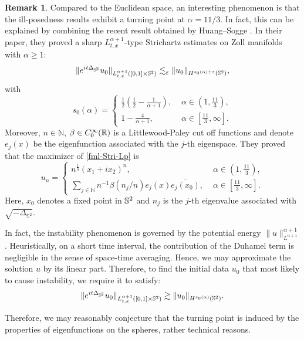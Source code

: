 \documentclass[11pt, reqno]{amsart}
\numberwithin{equation}{section}
\newcommand{\R}{\Bbb R}
\theoremstyle{definition}
\newtheorem{remark}[theorem]{Remark}
\theoremstyle{remark}
\begin{document}
\begin{remark}
Compared to the Euclidean space, an interesting phenomenon is that the ill-posedness results exhibit a turning point at $\alpha=11/3$. In fact, this can be explained by combining the recent result obtained by Huang–Sogge \cite{Huang}. In their paper, they proved a sharp $L^{\alpha+1}_{t,x}$-type Strichartz estimates on Zoll manifolds with $\alpha \ge 1$:
\begin{equation}\label{fml-Stri-Lp}
\|e^{it\Delta_{\Bbb S^2}}u_0\|_{L^{\alpha+1}_{t,x}([0,1]\times \Bbb S^2)} \lesssim_\varepsilon
\|u_0\|_{H^{s_0(\alpha)+\varepsilon}(\Bbb S^2)},
\end{equation}
with
\begin{equation*}
s_0(\alpha)=\begin{cases}
\frac{1}{2}(\frac{1}{2}-\frac{1}{\alpha+1}),\,\, &\alpha\in(1,\frac{11}{3}),\\
1-\frac{4}{\alpha+1},\,\, &\alpha\in[\frac{11}{3},\infty].
\end{cases}
\end{equation*}
Moreover, $n\in \mathbb{N}$, $\beta\in C^\infty_0(\R)$ is a Littlewood-Paley cut off functions and denote $e_j(x)$ be the eigenfunction associated with the $j$-th eigenspace. They proved that the maximizer of \eqref{fml-Stri-Lp} is
\begin{equation*}
u_n=\begin{cases}
n^{\frac{1}{4}}(x_1+ix_2)^n,\,\, &\alpha\in(1,\frac{11}{3}),\\
\sum\limits_{j\in\mathbb{N}}n^{-1}\beta(n_j/n)e_j(x)\overline{e_j(x_0)},\,\,&\alpha\in[\frac{11}3{,\infty}].
\end{cases}
\end{equation*}
Here, $x_0$ denotes a fixed point in $\Bbb S^2$ and $n_j$ is the $j$-th eigenvalue associated with $\sqrt{-\Delta_{\mathbb S^2}}$.
		
In fact, the instability phenomenon is governed by the  potential energy $\|u\|^{\alpha+1}_{L^{\alpha+1}}$. Heuristically, on a short time interval,  the contribution of the Duhamel term is negligible in the sense of space-time averaging. Hence, we may approximate the solution 
$u$ by its linear part.
 Therefore, to find the initial data $u_0$ that most likely to cause instability, we require it to satisfy:
\begin{equation*}
\|e^{it\Delta_{\Bbb S^2}}u_0\|_{L^{\alpha+1}_{t,x}([0,1]\times \Bbb S^2)} \gtrsim \|u_0\|_{H^{s_0(\alpha)}(\Bbb S^2)}.
\end{equation*}
		
Therefore, we may reasonably conjecture that the turning point is induced by the properties of eigenfunctions on the spheres, rather technical reasons.
		
\end{remark}
	
\end{document}
